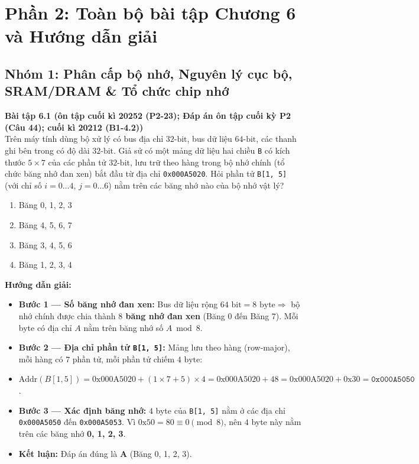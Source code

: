 \newpage
\section{Phần 2: Toàn bộ bài tập Chương 6 và Hướng dẫn giải}

\subsection{Nhóm 1: Phân cấp bộ nhớ, Nguyên lý cục bộ, SRAM/DRAM \& Tổ chức chip nhớ}

\textbf{Bài tập 6.1 (ôn tập cuối kì 20252 (P2-23); Đáp án ôn tập cuối kỳ P2 (Câu 44); cuối kì 20212 (B1-4.2))}\\
Trên máy tính dùng bộ xử lý có bus địa chỉ $32\text{-bit}$, bus dữ liệu $64\text{-bit}$, các thanh ghi bên trong có độ dài $32\text{-bit}$. Giả sử có một mảng dữ liệu hai chiều \texttt{B} có kích thước $5 \times 7$ của các phần tử $32\text{-bit}$, lưu trữ theo hàng trong bộ nhớ chính (tổ chức băng nhớ đan xen) bắt đầu từ địa chỉ \texttt{0x000A5020}. Hỏi phần tử \texttt{B[1, 5]} (với chỉ số $i = 0\dots4$, $j = 0\dots6$) nằm trên các băng nhớ nào của bộ nhớ vật lý?
\begin{enumerate}[label=\Alph*.]
    \item Băng 0, 1, 2, 3
    \item Băng 4, 5, 6, 7
    \item Băng 3, 4, 5, 6
    \item Băng 1, 2, 3, 4
\end{enumerate}
\textbf{Hướng dẫn giải:}
\begin{itemize}
    \item \textbf{Bước 1 --- Số băng nhớ đan xen:} Bus dữ liệu rộng $64\text{ bit} = 8\text{ byte} \Rightarrow$ bộ nhớ chính được chia thành \textbf{$8$ băng nhớ đan xen} (Băng $0$ đến Băng $7$). Mỗi byte có địa chỉ $A$ nằm trên băng nhớ số $A \bmod 8$.
    \item \textbf{Bước 2 --- Địa chỉ phần tử \texttt{B[1, 5]}:} Mảng lưu theo hàng (row-major), mỗi hàng có $7$ phần tử, mỗi phần tử chiếm $4\text{ byte}$:
    \item $\text{Addr}(B[1, 5]) = \text{0x000A5020} + (1 \times 7 + 5) \times 4 = \text{0x000A5020} + 48 = \text{0x000A5020} + \text{0x30} = \texttt{0x000A5050}$.
    \item \textbf{Bước 3 --- Xác định băng nhớ:} $4$ byte của \texttt{B[1, 5]} nằm ở các địa chỉ \texttt{0x000A5050} đến \texttt{0x000A5053}. Vì $\text{0x50} = 80 \equiv 0 \pmod 8$, nên $4$ byte này nằm trên các băng nhớ \textbf{0, 1, 2, 3}.
    \item \textbf{Kết luận:} Đáp án đúng là \textbf{A} (Băng 0, 1, 2, 3).
\end{itemize}

